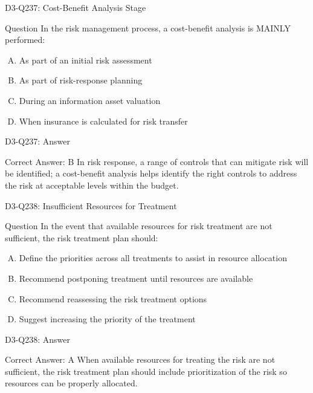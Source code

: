 \documentclass{beamer}
\begin{document}
	\begin{frame}{D3-Q237: Cost-Benefit Analysis Stage}
		\begin{block}{Question}
			In the risk management process, a cost-benefit analysis is MAINLY performed:
		\end{block}
		\begin{enumerate}[(A)]
			\item As part of an initial risk assessment
			\item As part of risk-response planning
			\item During an information asset valuation
			\item When insurance is calculated for risk transfer
		\end{enumerate}
	\end{frame}
	\begin{frame}{D3-Q237: Answer}
		\begin{block}{Correct Answer: B}
			In risk response, a range of controls that can mitigate risk will be identified; a cost-benefit analysis helps identify the right controls to address the risk at acceptable levels within the budget.
		\end{block}
	\end{frame}
	
	\begin{frame}{D3-Q238: Insufficient Resources for Treatment}
		\begin{block}{Question}
			In the event that available resources for risk treatment are not sufficient, the risk treatment plan should:
		\end{block}
		\begin{enumerate}[(A)]
			\item Define the priorities across all treatments to assist in resource allocation
			\item Recommend postponing treatment until resources are available
			\item Recommend reassessing the risk treatment options
			\item Suggest increasing the priority of the treatment
		\end{enumerate}
	\end{frame}
	\begin{frame}{D3-Q238: Answer}
		\begin{block}{Correct Answer: A}
			When available resources for treating the risk are not sufficient, the risk treatment plan should include prioritization of the risk so resources can be properly allocated.
		\end{block}
	\end{frame}
	
\end{document}
